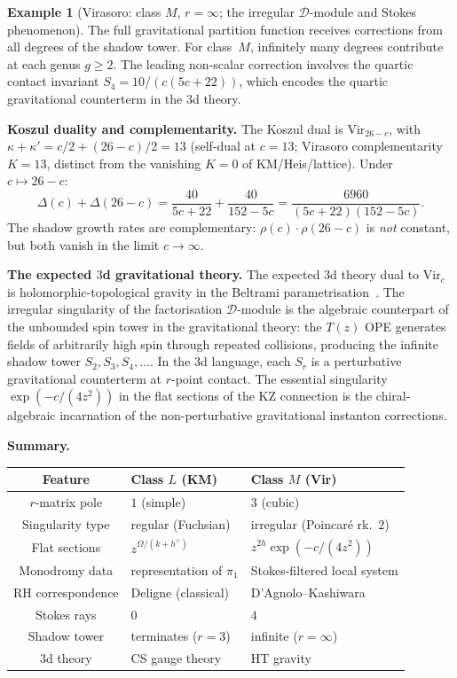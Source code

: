 \documentclass[11pt,reqno]{amsart}
\theoremstyle{definition}
\newtheorem{example}[theorem]{Example}
\theoremstyle{remark}
\newcommand{\cD}{\mathcal{D}}
\numberwithin{equation}{section}
\begin{document}
\begin{example}[Virasoro: class $M$, $r = \infty$;
the irregular $\cD$-module and Stokes phenomenon]
The full gravitational partition function receives
corrections from all degrees of the shadow tower.
For class~$M$, infinitely many degrees contribute at
each genus $g \geq 2$. The leading non-scalar correction
involves the quartic contact invariant
$S_4 = 10/(c(5c+22))$, which encodes the quartic
gravitational counterterm in the $3$d theory.

\medskip
\noindent\textbf{Koszul duality and complementarity.}
The Koszul dual is $\mathrm{Vir}_{26 - c}$, with
$\kappa + \kappa' = c/2 + (26 - c)/2 = 13$
(self-dual at $c = 13$; Virasoro complementarity $K = 13$,
distinct from the vanishing $K = 0$ of KM/Heis/lattice).
Under $c \mapsto 26 - c$:
\begin{equation}\label{eq:vir-compl-delta}
  \Delta(c) + \Delta(26 - c)
  = \frac{40}{5c + 22} + \frac{40}{152 - 5c}
  = \frac{6960}{(5c+22)(152 - 5c)}.
\end{equation}
The shadow growth rates are complementary:
$\rho(c) \cdot \rho(26 - c)$ is \emph{not} constant, but
both vanish in the limit $c \to \infty$.

\medskip
\noindent\textbf{The expected $3$d gravitational theory.}
The expected $3$d theory dual to $\mathrm{Vir}_c$ is
holomorphic-topological gravity in the Beltrami
parametrisation~\cite{CG17}. The irregular singularity of the
factorisation $\cD$-module is the algebraic counterpart of
the unbounded spin tower in the gravitational theory:
the $T(z)$ OPE generates fields of arbitrarily high spin
through repeated collisions, producing the infinite shadow
tower $S_2, S_3, S_4, \ldots$. In the $3$d language,
each $S_r$ is a perturbative gravitational counterterm
at $r$-point contact. The essential singularity
$\exp(-c/(4z^2))$ in the flat sections of the KZ connection
is the chiral-algebraic incarnation of the non-perturbative
gravitational instanton corrections.

\medskip
\noindent\textbf{Summary.}
\begin{center}
\begin{tabular}{@{} c l l @{}}
\toprule
\textbf{Feature}
  & \textbf{Class $L$ (KM)}
  & \textbf{Class $M$ (Vir)} \\
\midrule
$r$-matrix pole & $1$ (simple) & $3$ (cubic) \\
Singularity type & regular (Fuchsian) & irregular (Poincar\'e rk.\ $2$) \\
Flat sections & $z^{\Omega/(k+h^\vee)}$ &
  $z^{2h}\exp(-c/(4z^2))$ \\
Monodromy data & representation of $\pi_1$
  & Stokes-filtered local system \\
RH correspondence & Deligne (classical)
  & D'Agnolo--Kashiwara \\
Stokes rays & $0$ & $4$ \\
Shadow tower & terminates ($r = 3$)
  & infinite ($r = \infty$) \\
$3$d theory & CS gauge theory
  & HT gravity \\
\bottomrule
\end{tabular}
\end{center}
\end{example}
\end{document}
